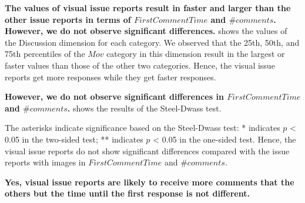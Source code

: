 \textbf{The values of visual issue reports 
result in faster and larger than the other issue reports 
in terms of $FirstCommentTime$ and $\#comments$.
However, we do not observe significant differences.
} 
shows the values of the Discussion dimension
for each category. 
We observed that the 25th, 50th, and 75th percentiles of 
the $Mov$ category in 
this dimension
result in the largest or faster values than those of 
the other two categories.
Hence, the visual issue reports get more responses 
while they get faster responses. 


\textbf{However, we do not observe 
significant differences in $FirstCommentTime$ and $\#comments$.}
 shows the results of 
the Steel-Dwass test. 

The asterisks indicate significance based on 
the Steel-Dwass test: * indicates $p$ < 0.05 in 
the two-sided test; 
** indicates $p$ < 0.05 in the one-sided test. 
Hence, the visual issue reports do not show 
significant differences compared with 
the issue reports with images in 
$FirstCommentTime$ and $\#comments$.

{\bf Yes, visual issue reports are likely to receive more comments that the others but the time until the first response is not different. 
}











